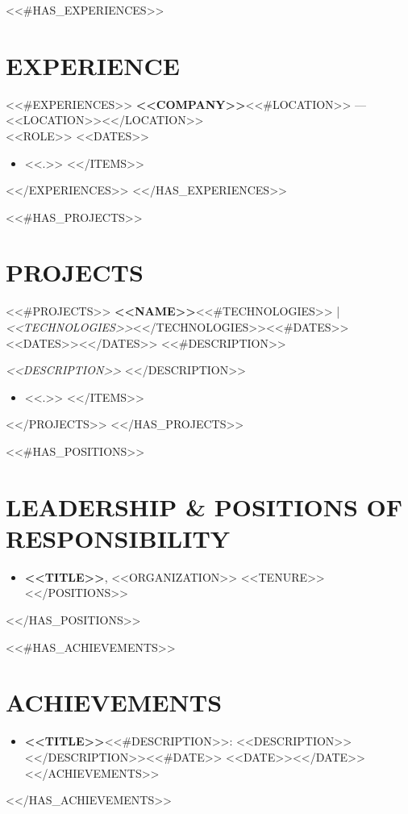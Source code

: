 \documentclass[a4paper,11pt]{article}
\begin{document}
<<#HAS_EXPERIENCES>>
\section*{EXPERIENCE}
<<#EXPERIENCES>>
\textbf{<<COMPANY>>}<<#LOCATION>> --- <<LOCATION>><</LOCATION>> \\
<<ROLE>> \hfill <<DATES>>
\begin{itemize}
<<#ITEMS>>
    \item <<.>>
<</ITEMS>>
\end{itemize}

<</EXPERIENCES>>
\vspace{-2mm}
<</HAS_EXPERIENCES>>

<<#HAS_PROJECTS>>
\section*{PROJECTS}
<<#PROJECTS>>
\textbf{<<NAME>>}<<#TECHNOLOGIES>> | \textit{<<TECHNOLOGIES>>}<</TECHNOLOGIES>><<#DATES>> \hfill <<DATES>><</DATES>>
<<#DESCRIPTION>>

\textit{<<DESCRIPTION>>}
<</DESCRIPTION>>
\begin{itemize}
<<#ITEMS>>
    \item <<.>>
<</ITEMS>>
\end{itemize}

<</PROJECTS>>
\vspace{-2mm}
<</HAS_PROJECTS>>

<<#HAS_POSITIONS>>
\section*{LEADERSHIP \& POSITIONS OF RESPONSIBILITY}
\begin{itemize}
<<#POSITIONS>>
    \item \textbf{<<TITLE>>}, <<ORGANIZATION>> \hfill <<TENURE>>
<</POSITIONS>>
\end{itemize}
\vspace{-2mm}
<</HAS_POSITIONS>>

<<#HAS_ACHIEVEMENTS>>
\section*{ACHIEVEMENTS}
\begin{itemize}
<<#ACHIEVEMENTS>>
    \item \textbf{<<TITLE>>}<<#DESCRIPTION>>: <<DESCRIPTION>><</DESCRIPTION>><<#DATE>> \hfill <<DATE>><</DATE>>
<</ACHIEVEMENTS>>
\end{itemize}
<</HAS_ACHIEVEMENTS>>

\end{document}
